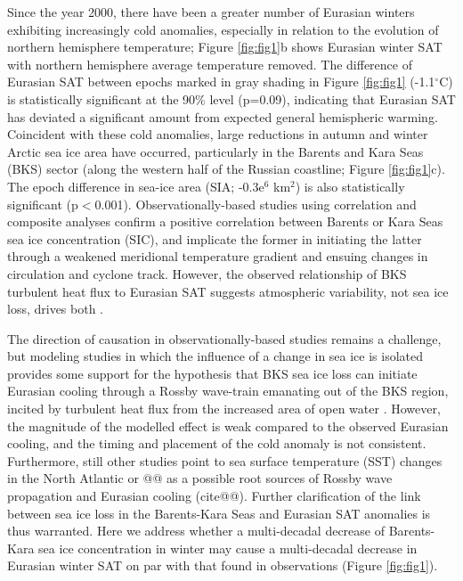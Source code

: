 \documentclass{nature}
\begin{document}
Since the year 2000, there have been a greater number of Eurasian winters exhibiting increasingly cold anomalies, especially in relation to the evolution of northern hemisphere temperature; Figure \ref{fig:fig1}b shows Eurasian winter SAT with northern hemisphere average temperature removed. The difference of Eurasian SAT between epochs marked in gray shading in Figure \ref{fig:fig1} (-1.1$^\circ$C) is statistically significant at the 90\% level (p=0.09), indicating that Eurasian SAT has deviated a significant amount from expected general hemispheric warming. Coincident with these cold anomalies, large reductions in autumn and winter Arctic sea ice area have occurred, particularly in the Barents and Kara Seas (BKS) sector (along the western half of the Russian coastline; Figure \ref{fig:fig1}c). The epoch difference in sea-ice area (SIA; -0.3e$^6$ km$^2$) is also statistically significant (p$<$0.001). Observationally-based studies using correlation and composite analyses confirm a positive correlation between Barents \cite{inoue12} or Kara \cite{outten12} Seas sea ice concentration (SIC), and implicate the former in initiating the latter through a weakened meridional temperature gradient and ensuing changes in circulation and cyclone track. However, the observed relationship of BKS turbulent heat flux to Eurasian SAT suggests atmospheric variability, not sea ice loss, drives both \cite{sorokina15}. 

The direction of causation in observationally-based studies remains a challenge, but modeling studies in which the influence of a change in sea ice is isolated provides some support for the hypothesis that BKS sea ice loss can initiate Eurasian cooling through a Rossby wave-train emanating out of the BKS region, incited by turbulent heat flux from the increased area of open water \cite{honda09,petoukhov10,mori14,kim14,peings14}. However, the magnitude of the modelled effect is weak compared to the observed Eurasian cooling, and the timing and placement of the cold anomaly is not consistent. Furthermore, still other studies point to sea surface temperature (SST) changes in the North Atlantic or @@ as a possible root sources of Rossby wave propagation and Eurasian cooling (cite@@). Further clarification of the link between sea ice loss in the Barents-Kara Seas and Eurasian SAT anomalies is thus warranted. Here we address whether a multi-decadal decrease of Barents-Kara sea ice concentration in winter may cause a multi-decadal decrease in Eurasian winter SAT on par with that found in observations (Figure \ref{fig:fig1}). 
\end{document}

